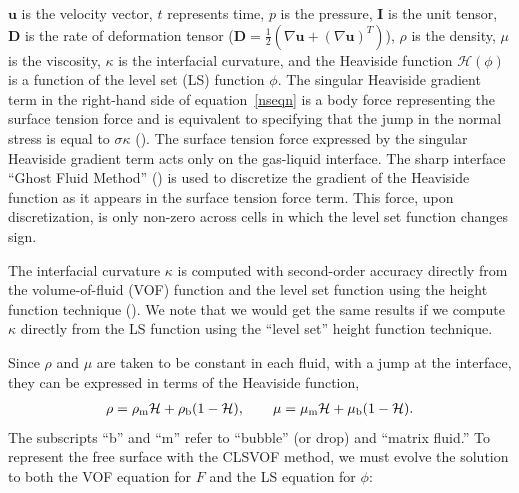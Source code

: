\documentclass{elsarticle}
\newcommand{\Hea}{\mathcal{H}}
\newcommand{\vv}{\mathbf}
\newcommand{\bmD}{\vv{D}}
\newcommand{\bmg}{\vv{g}}
\newcommand{\bmI}{\vv{I}}
\newcommand{\bmu}{\vv{u}}
\begin{document}
%
%
\par
$\bmu$ is the velocity vector, $t$ represents time, $p$ is the pressure, $\bmI$ is the unit tensor, $\bmD$ is the rate of deformation tensor ($\bmD=\frac{1}{2}(\nabla\bmu+(\nabla\bmu)^{T})$), $\rho$ is the density, $\mu$ is the viscosity, $\kappa$ is the interfacial curvature, and the Heaviside function $\Hea(\phi)$ is a function of the level set (LS) function $\phi$. The singular Heaviside gradient term in the right-hand side of equation~\eqref{nseqn} is a body force representing the surface tension force and is equivalent to specifying that the jump in the normal stress is equal to $\sigma\kappa$ (\citet{TanguyEtAl2007}).  The surface tension force expressed by the singular Heaviside gradient term acts only on the gas-liquid interface.  The sharp interface ``Ghost Fluid Method'' (\citet{KanFedLiu00}) is used to discretize the gradient of the Heaviside function as it appears in the surface tension force term.  This force, upon discretization, is only non-zero across cells in which the level set function changes sign.
\par
The interfacial curvature $\kappa$ is computed with second-order accuracy directly from the volume-of-fluid (VOF) function and the level set function using the height function technique (\citet{Sus03,SusSmiHusOhtZhi07}).  We note that we would get the same results if we compute $\kappa$ directly from the LS function using the ``level set'' height function technique.
\par
Since $\rho$ and $\mu$ are taken to be constant in each fluid, with a jump at
the interface, they can be expressed in terms of the Heaviside function,
%
\begin{eqnarray}\label{rhomu}
  \rho=\rho_{\rm m}\Hea+\rho_{\rm b}(1-\Hea), \qquad 
  \mu=\mu_{\rm m}\Hea+\mu_{\rm b}(1-\Hea).
\end{eqnarray}
%
The subscripts ``b'' and ``m'' refer to ``bubble'' (or drop) and ``matrix fluid.'' To represent the free surface with the CLSVOF method, we must evolve the solution to both the VOF equation for $F$ and the LS equation for $\phi$:
\end{document}
